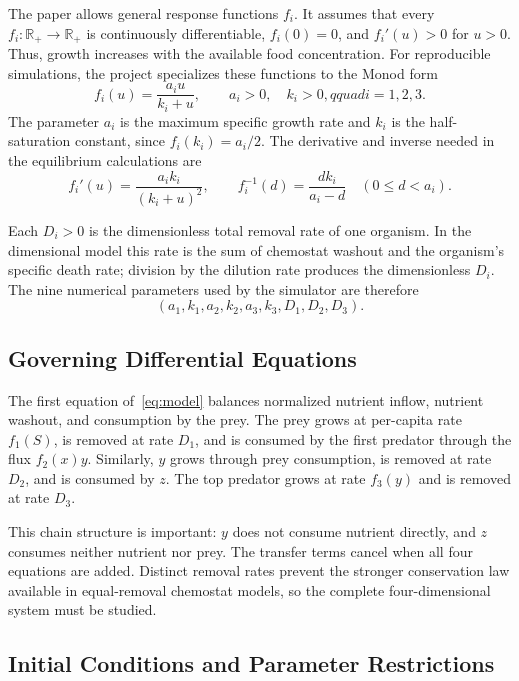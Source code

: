 The paper allows general response functions \(f_i\).  It assumes that every
\(f_i:\mathbb{R}_+\rightarrow\mathbb{R}_+\) is continuously differentiable,
\(f_i(0)=0\), and \(f_i'(u)>0\) for \(u>0\).  Thus, growth increases with the
available food concentration.  For reproducible simulations, the project
specializes these functions to the Monod form
\begin{equation}
\label{eq:monod}
f_i(u)=\frac{a_i u}{k_i+u},\qquad a_i>0,\quad k_i>0,qquad i=1,2,3.
\end{equation}
The parameter \(a_i\) is the maximum specific growth rate and \(k_i\) is the
half-saturation constant, since \(f_i(k_i)=a_i/2\).  The derivative and inverse
needed in the equilibrium calculations are
\begin{equation}
\label{eq:monod-derivative-inverse}
f_i'(u)=\frac{a_i k_i}{(k_i+u)^2},
\qquad
f_i^{-1}(d)=\frac{d k_i}{a_i-d}\quad (0\leq d<a_i).
\end{equation}

Each \(D_i>0\) is the dimensionless total removal rate of one organism.  In
the dimensional model this rate is the sum of chemostat washout and the
organism's specific death rate; division by the dilution rate produces the
dimensionless \(D_i\).  The nine numerical parameters used by the simulator
are therefore
\[
(a_1,k_1,a_2,k_2,a_3,k_3,D_1,D_2,D_3).
\]

\subsection{Governing Differential Equations}

The first equation of~\eqref{eq:model} balances normalized nutrient inflow,
nutrient washout, and consumption by the prey.  The prey grows at per-capita
rate \(f_1(S)\), is removed at rate \(D_1\), and is consumed by the first
predator through the flux \(f_2(x)y\).  Similarly, \(y\) grows through prey
consumption, is removed at rate \(D_2\), and is consumed by \(z\).  The top
predator grows at rate \(f_3(y)\) and is removed at rate \(D_3\).

This chain structure is important: \(y\) does not consume nutrient directly,
and \(z\) consumes neither nutrient nor prey.  The transfer terms cancel when
all four equations are added.  Distinct removal rates prevent the stronger
conservation law available in equal-removal chemostat models, so the complete
four-dimensional system must be studied.

\subsection{Initial Conditions and Parameter Restrictions}

